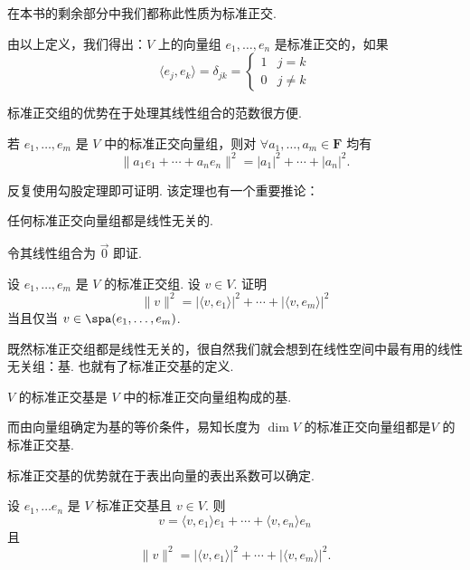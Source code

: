 在本书的剩余部分中我们都称此性质为标准正交.

由以上定义，我们得出：$ V $ 上的向量组 $ e_1, \ldots , e_n $ 是标准正交的，如果
\[ \langle e_j, e_k \rangle = \delta _{jk} = \begin{cases}
        1 & j = k    \\
        0 & j \neq k
    \end{cases} \]

标准正交组的优势在于处理其线性组合的范数很方便.

\begin{theorem}
    若 $e_1, \ldots , e_m$ 是 $ V $ 中的标准正交向量组，则对 $\forall a_1, \ldots, a_m \in \mathbf{F}$ 均有
    \[ \lVert a_1e_1 + \cdots + a_ne_n\rVert^2 = \lvert a_1 \rvert^2 + \cdots + \lvert a_n \rvert^2.\]
\end{theorem}

反复使用勾股定理即可证明. 该定理也有一个重要推论：

\begin{theorem}
    任何标准正交向量组都是线性无关的.
\end{theorem}

令其线性组合为 $ \vec{0} $ 即证.

\begin{example} \label{ex:22:标准正交组}
    设 $e_1, \ldots , e_m$ 是 $ V $ 的标准正交组. 设 $ v \in V $. 证明
    \[ \lVert v \rVert^2 = \lvert \langle v, e_1\rangle \rvert^2 + \cdots + \lvert \langle v, e_m\rangle \rvert^2 \]
    当且仅当 $ v \in \spa(e_1, \ldots , e_m)$.
\end{example}

既然标准正交组都是线性无关的，很自然我们就会想到在线性空间中最有用的线性无关组：基. 也就有了标准正交基的定义.

\begin{definition}
    $ V $ 的标准正交基是 $ V $ 中的标准正交向量组构成的基.
\end{definition}

而由向量组确定为基的等价条件，易知长度为 $\dim V$ 的标准正交向量组都是$ V $ 的标准正交基.

标准正交基的优势就在于表出向量的表出系数可以确定.

\begin{theorem}
    设 $e_1, \ldots e_n$ 是 $ V $ 标准正交基且 $ v \in V$. 则
    \begin{equation} \label{eq:23:Fourier展开}
        v = \langle v, e_1 \rangle e_1 + \cdots + \langle v, e_n \rangle e_n
    \end{equation}
    且
    \[ \lVert v \rVert^2 = \lvert \langle v, e_1\rangle \rvert^2 + \cdots + \lvert \langle v, e_m\rangle \rvert^2. \]
\end{theorem}

